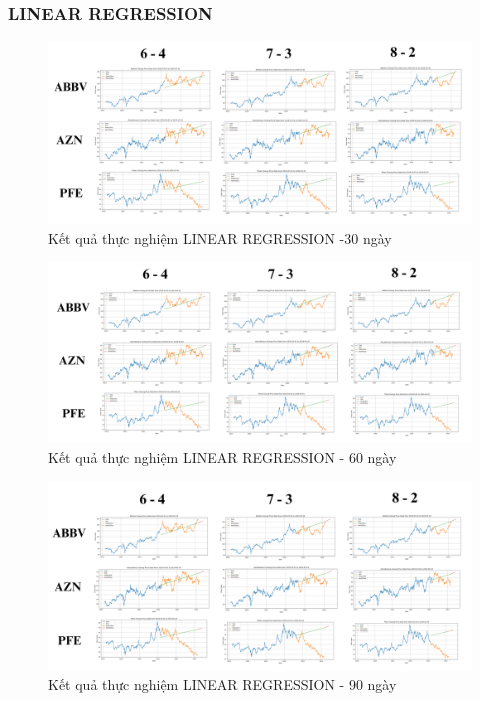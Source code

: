 \documentclass[conference]{IEEEtran}
\begin{document}
\subsubsection{LINEAR REGRESSION}
\vspace{-15pt}
\begin{figure}[H]
    \centering
    \begin{minipage}{0.5\textwidth}
    \centering
    \includegraphics[width=1\textwidth]{Image/LR30.png}
    \caption{Kết quả thực nghiệm LINEAR REGRESSION -30 ngày}
    \label{fig:1}
    \end{minipage}
\end{figure}
\begin{figure}[H]
    \centering
    \begin{minipage}{0.5\textwidth}
    \centering
    \includegraphics[width=1\textwidth]{Image/LR60.png}
    \caption{Kết quả thực nghiệm LINEAR REGRESSION - 60 ngày}
    \label{fig:1}
    \end{minipage}
\end{figure}
\begin{figure}[H]
    \centering
    \begin{minipage}{0.5\textwidth}
    \centering
    \includegraphics[width=1\textwidth]{Image/LR90.png}
    \caption{Kết quả thực nghiệm LINEAR REGRESSION - 90 ngày}
    \label{fig:1}
    \end{minipage}
\end{figure}
\end{document}
